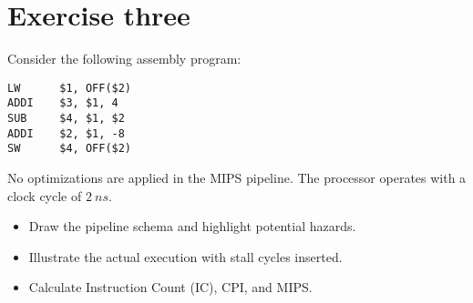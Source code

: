 \section{Exercise three}

Consider the following assembly program: 
\begin{verbatim}
LW      $1, OFF($2)
ADDI    $3, $1, 4
SUB     $4, $1, $2
ADDI    $2, $1, -8
SW      $4, OFF($2)
\end{verbatim}
No optimizations are applied in the MIPS pipeline. 
The processor operates with a clock cycle of $2\:ns$. 
\begin{itemize}
    \item Draw the pipeline schema and highlight potential hazards.
    \item Illustrate the actual execution with stall cycles inserted.
    \item Calculate Instruction Count (IC), CPI, and MIPS.\@
\end{itemize}


